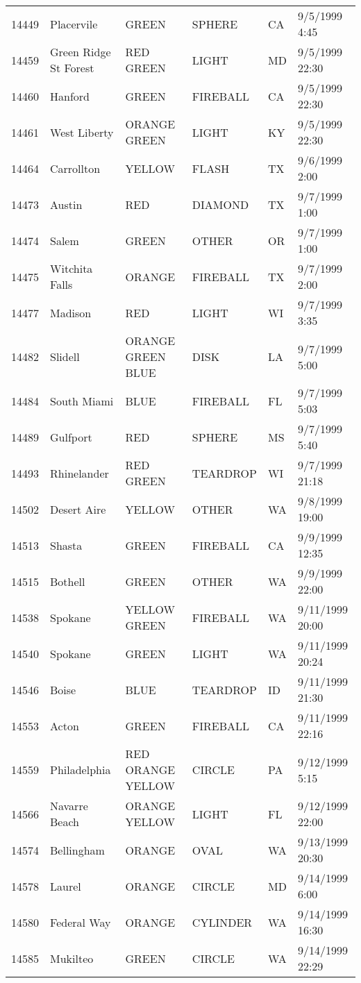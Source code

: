 \begin{tabular}{llllll}
14449 & Placervile & GREEN & SPHERE & CA & 9/5/1999 4:45 \\
14459 & Green Ridge St Forest & RED GREEN & LIGHT & MD & 9/5/1999 22:30 \\
14460 & Hanford & GREEN & FIREBALL & CA & 9/5/1999 22:30 \\
14461 & West Liberty & ORANGE GREEN & LIGHT & KY & 9/5/1999 22:30 \\
14464 & Carrollton & YELLOW & FLASH & TX & 9/6/1999 2:00 \\
14473 & Austin & RED & DIAMOND & TX & 9/7/1999 1:00 \\
14474 & Salem & GREEN & OTHER & OR & 9/7/1999 1:00 \\
14475 & Witchita Falls & ORANGE & FIREBALL & TX & 9/7/1999 2:00 \\
14477 & Madison & RED & LIGHT & WI & 9/7/1999 3:35 \\
14482 & Slidell & ORANGE GREEN BLUE & DISK & LA & 9/7/1999 5:00 \\
14484 & South Miami & BLUE & FIREBALL & FL & 9/7/1999 5:03 \\
14489 & Gulfport & RED & SPHERE & MS & 9/7/1999 5:40 \\
14493 & Rhinelander & RED GREEN & TEARDROP & WI & 9/7/1999 21:18 \\
14502 & Desert Aire & YELLOW & OTHER & WA & 9/8/1999 19:00 \\
14513 & Shasta & GREEN & FIREBALL & CA & 9/9/1999 12:35 \\
14515 & Bothell & GREEN & OTHER & WA & 9/9/1999 22:00 \\
14538 & Spokane & YELLOW GREEN & FIREBALL & WA & 9/11/1999 20:00 \\
14540 & Spokane & GREEN & LIGHT & WA & 9/11/1999 20:24 \\
14546 & Boise & BLUE & TEARDROP & ID & 9/11/1999 21:30 \\
14553 & Acton & GREEN & FIREBALL & CA & 9/11/1999 22:16 \\
14559 & Philadelphia & RED ORANGE YELLOW & CIRCLE & PA & 9/12/1999 5:15 \\
14566 & Navarre Beach & ORANGE YELLOW & LIGHT & FL & 9/12/1999 22:00 \\
14574 & Bellingham & ORANGE & OVAL & WA & 9/13/1999 20:30 \\
14578 & Laurel & ORANGE & CIRCLE & MD & 9/14/1999 6:00 \\
14580 & Federal Way & ORANGE & CYLINDER & WA & 9/14/1999 16:30 \\
14585 & Mukilteo & GREEN & CIRCLE & WA & 9/14/1999 22:29 \\

\end{tabular}
